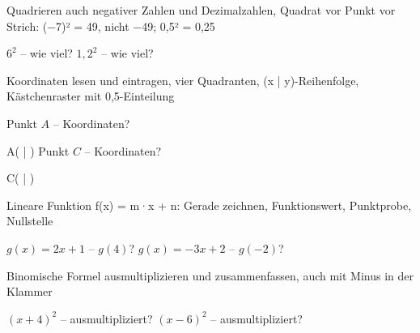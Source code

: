 \setcounter{aufgabe}{0}

\begin{aufgabe}{Quadrieren auch negativer Zahlen und Dezimalzahlen, Quadrat vor Punkt vor Strich: (−7)² = 49, nicht −49; 0,5² = 0,25}
\begin{teile}
\teil $6^2$ – wie viel? \leerfeld
\teil $1{,}2^2$ – wie viel? \leerfeld
\end{teile}
\end{aufgabe}

\begin{aufgabe}{Koordinaten lesen und eintragen, vier Quadranten, (x | y)-Reihenfolge, Kästchenraster mit 0,5-Einteilung}
\begin{teile}
\teil Punkt $A$ – Koordinaten?

\begin{ksys}[xmin=-4,xmax=4,ymin=-4,ymax=4,ablesen]
\end{ksys}
A( \leerfeld | \leerfeld )
\teil Punkt $C$ – Koordinaten?

\begin{ksys}[xmin=-5,xmax=4,ymin=-4,ymax=4,ablesen]
\end{ksys}
C( \leerfeld | \leerfeld )
\end{teile}
\end{aufgabe}

\begin{aufgabe}{Lineare Funktion f(x) = m·x + n: Gerade zeichnen, Funktionswert, Punktprobe, Nullstelle}
\begin{teile}
\teil $g(x) = 2x + 1$ – $g(4)$? \leerfeld
\teil $g(x) = -3x + 2$ – $g(-2)$? \leerfeld
\end{teile}
\end{aufgabe}

\begin{aufgabe}{Binomische Formel ausmultiplizieren und zusammenfassen, auch mit Minus in der Klammer}
\begin{teile}
\teil $(x + 4)^2$ – ausmultipliziert? \leerfeld
\teil $(x - 6)^2$ – ausmultipliziert? \leerfeld
\end{teile}
\end{aufgabe}

